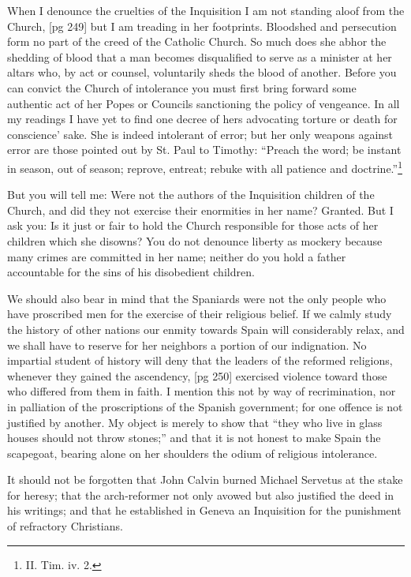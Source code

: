 When I denounce the cruelties of the Inquisition
I am not standing aloof from the Church,
[pg 249]
but I am treading in her footprints. Bloodshed
and persecution form no part of the creed of the
Catholic Church. So much does she abhor the
shedding of blood that a man becomes disqualified
to serve as a minister at her altars who, by
act or counsel, voluntarily sheds the blood of another.
Before you can convict the Church of intolerance
you must first bring forward some authentic
act of her Popes or Councils sanctioning
the policy of vengeance. In all my readings I
have yet to find one decree of hers advocating
torture or death for conscience' sake. She is indeed
intolerant of error; but her only weapons
against error are those pointed out by St. Paul
to Timothy: “Preach the word; be instant in
season, out of season; reprove, entreat; rebuke
with all patience and doctrine.”\footnote{II. Tim. iv. 2.}

But you will tell me: Were not the authors of
the Inquisition children of the Church, and did
they not exercise their enormities in her name?
Granted. But I ask you: Is it just or fair to
hold the Church responsible for those acts of her
children which she disowns? You do not denounce
liberty as mockery because many crimes are committed
in her name; neither do you hold a father
accountable for the sins of his disobedient children.

We should also bear in mind that the Spaniards
were not the only people who have proscribed
men for the exercise of their religious belief. If
we calmly study the history of other nations our
enmity towards Spain will considerably relax,
and we shall have to reserve for her neighbors a
portion of our indignation. No impartial student
of history will deny that the leaders of the reformed
religions, whenever they gained the ascendency,
[pg 250]
exercised violence toward those who
differed from them in faith. I mention this not
by way of recrimination, nor in palliation of the
proscriptions of the Spanish government; for one
offence is not justified by another. My object is
merely to show that “they who live in glass houses
should not throw stones;” and that it is not honest
to make Spain the scapegoat, bearing alone
on her shoulders the odium of religious intolerance.

It should not be forgotten that John Calvin
burned Michael Servetus at the stake for heresy;
that the arch-reformer not only avowed but also
justified the deed in his writings; and that he
established in Geneva an Inquisition for the punishment
of refractory Christians.

